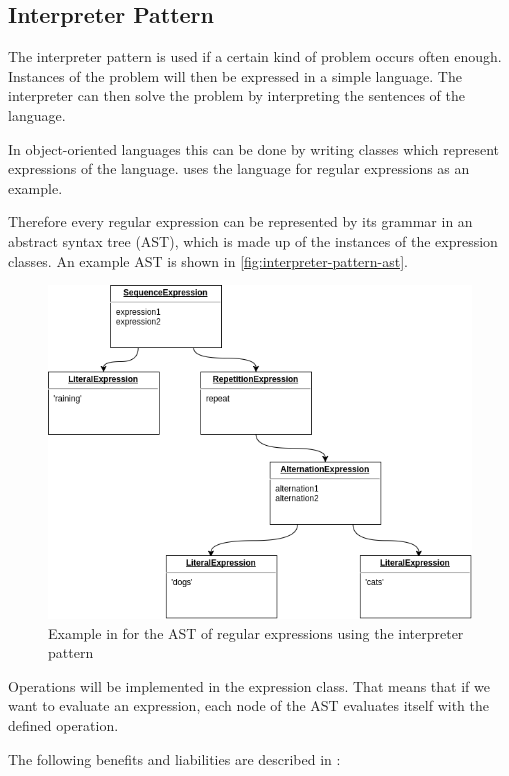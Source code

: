 \documentclass{llncs}
\begin{document}
\subsection{Interpreter Pattern} \label{ssec:interpreter}
The interpreter pattern is used if a certain kind of problem occurs often enough. Instances of the problem will then be expressed in a simple language. The interpreter can then solve the problem by interpreting the sentences of the language.

In object-oriented languages this can be done by writing classes which represent expressions of the language. \cite{GHJV94} uses the language for regular expressions as an example.

Therefore every regular expression can be represented by its grammar in an abstract syntax tree (AST), which is made up of the instances of the expression classes. An example AST is shown in \autoref{fig:interpreter-pattern-ast}.

\begin{figure}[h]
	\centering
	\includegraphics[width=\textwidth]{img/Interpreter-Pattern-AST-Example}
	\caption{Example in \cite{GHJV94} for the AST of regular expressions using the interpreter pattern }
	\label{fig:interpreter-pattern-ast}
\end{figure} 

Operations will be implemented in the expression class. That means that if we want to evaluate an expression, each node of the AST evaluates itself with the defined operation.

The following benefits and liabilities are described in \cite{GHJV94}:
\end{document}
